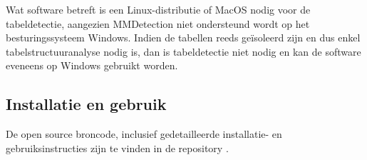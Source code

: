 Wat software betreft is een Linux-distributie of MacOS nodig voor de tabeldetectie, aangezien MMDetection niet ondersteund wordt op het besturingssysteem Windows. Indien de tabellen reeds geïsoleerd zijn en dus enkel tabelstructuuranalyse nodig is, dan is tabeldetectie niet nodig en kan de software eveneens op Windows gebruikt worden.

\subsection{Installatie en gebruik}
\label{subsec:installatie-en-gebruik}

De open source broncode, inclusief gedetailleerde installatie- en gebruiksinstructies zijn te vinden in de repository \textcite{Nazari2020}.
